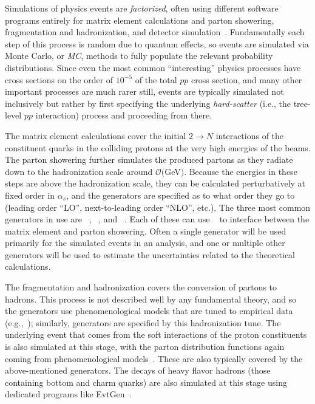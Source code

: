 Simulations of physics events are \textit{factorized}, often using different software programs entirely for matrix element calculations and parton showering, fragmentation and hadronization, and detector simulation~\cite{powhegintro}.
Fundamentally each step of this process is random due to quantum effects, so events are simulated via Monte Carlo, or \textit{MC}, methods to fully populate the relevant probability distributions.
Since even the most common ``interesting'' physics processes have cross sections on the order of $10^{-5}$ of the total $pp$ cross section, and many other important processes are much rarer still, events are typically simulated not inclusively but rather by first specifying the underlying \textit{hard-scatter} (i.e., the tree-level $pp$ interaction) process and proceeding from there.

The matrix element calculations cover the initial $2\rightarrow N$ interactions of the constituent quarks in the colliding protons at the very high energies of the beams.
The parton showering further simulates the produced partons as they radiate down to the hadronization scale around $\mathcal{O}($GeV$)$.
Because the energies in these steps are above the hadronization scale, they can be calculated perturbatively at fixed order in $\alpha_s$, and the generators are specified as to what order they go to (leading order ``LO'', next-to-leading order ``NLO'', etc.).
The three most common generators in use are \PYTHIA~\cite{Sjostrand:2007gs,Sjostrand:2014zea}, \SHERPA~\cite{Gleisberg:2008ta}, and \HERWIG~\cite{Bahr:2008pv,Bellm:2015jjp}.
Each of these can use \POWHEGBOX~\cite{Frixione:2007vw,Alioli:2010xd} to interface between the matrix element and parton showering.
Often a single generator will be used primarily for the simulated events in an analysis, and one or multiple other generators will be used to estimate the uncertainties related to the theoretical calculations.

The fragmentation and hadronization covers the conversion of partons to hadrons.
This process is not described well by any fundamental theory, and so the generators use phenomenological models that are tuned to empirical data (e.g.,~\cite{ATL-PHYS-PUB-2014-021}); similarly, generators are specified by this hadronization tune.
The underlying event that comes from the soft interactions of the proton constituents is also simulated at this stage, with the parton distribution functions again coming from phenomenological models~\cite{Lai:2010vv}.
These are also typically covered by the above-mentioned generators.
The decays of heavy flavor hadrons (those containing bottom and charm quarks) are also simulated at this stage using dedicated programs like EvtGen~\cite{Lange:2001uf}.

